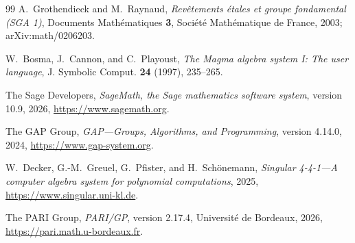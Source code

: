 \documentclass[11pt]{amsart}
\theoremstyle{definition}
\theoremstyle{remark}
\begin{document}
\begin{thebibliography}{99}
A.~Grothendieck and M.~Raynaud,
\emph{Rev\^etements \'etales et groupe fondamental (SGA 1)},
Documents Math\'ematiques \textbf{3}, Soci\'et\'e Math\'ematique de France,
2003; arXiv:math/0206203.

W.~Bosma, J.~Cannon, and C.~Playoust,
\emph{The Magma algebra system I: The user language},
J. Symbolic Comput. \textbf{24} (1997), 235--265.

The Sage Developers,
\emph{SageMath, the Sage mathematics software system}, version 10.9, 2026,
\url{https://www.sagemath.org}.

The GAP Group,
\emph{GAP---Groups, Algorithms, and Programming}, version 4.14.0, 2024,
\url{https://www.gap-system.org}.

W.~Decker, G.-M.~Greuel, G.~Pfister, and H.~Sch\"onemann,
\emph{Singular 4-4-1---A computer algebra system for polynomial computations},
2025, \url{https://www.singular.uni-kl.de}.

The PARI Group,
\emph{PARI/GP}, version 2.17.4, Universit\'e de Bordeaux, 2026,
\url{https://pari.math.u-bordeaux.fr}.

\end{thebibliography}
\end{document}
